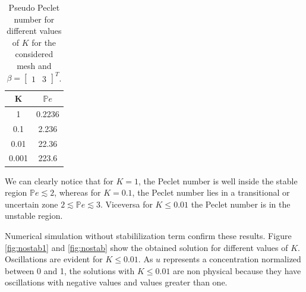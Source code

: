 \documentclass[hidelinks]{article}
\begin{document}
\begin{table}[H]
    \centering
    \begin{tabular}{c|c}
        K & $\mathbb{P}\!e$ \\
        \hline
        1 & 0.2236 \\
        0.1 & 2.236 \\
        0.01 & 22.36 \\
        0.001 & 223.6
    \end{tabular}
    \caption{Pseudo Peclet number for different values of $K$ for the considered mesh and $\beta = \begin{bmatrix}
    1 & 3
\end{bmatrix}^T$.}\label{tab:peclet}
\end{table}
We can clearly notice that for $K = 1$, the Peclet number is well inside the stable region $\mathbb{P}\!e \lesssim 2$, whereas for $K = 0.1$, the Peclet number lies in a transitional or uncertain zone $2 \lesssim \mathbb{P}\!e \lesssim 3$.
Viceversa for $K\leq 0.01$ the Peclet number is in the unstable region. 

Numerical simulation without stabililization term confirm these results. Figure \ref{fig:nostab1} and \ref{fig:nostab} show the obtained solution for different values of $K$. Oscillations are evident for $K\leq 0.01$. As $u$ represents a concentration normalized between 0 and 1, the solutions with $K\leq 0.01$ are non physical because they have oscillations with negative values and values greater than one.
\end{document}
